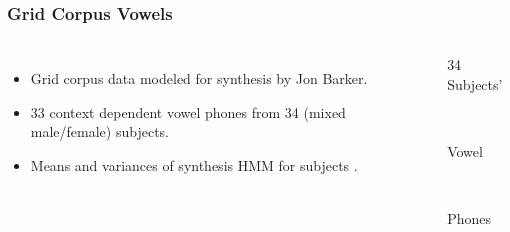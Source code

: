 \begin{frame}
  \frametitle{Grid Corpus Vowels}
  \begin{columns}
    \begin{itemize}
    \item Grid corpus data modeled for synthesis by Jon Barker.
    \item 33 context dependent vowel phones from 34 (mixed male/female) subjects.
    \item Means and variances of synthesis HMM for subjects {\scriptsize \citep{Shichiri:eigenvoices02}}.
    \end{itemize}

    \begin{center}
      \begin{minipage}[b][0.8\textheight][t]{0.5\columnwidth}%
        \begin{minipage}[c][0.3\textheight]{1\columnwidth}%
          \begin{center}
            34 Subjects'
          \end{center}%
        \end{minipage}\\
        \begin{minipage}[c][0.3\textheight]{1\columnwidth}%
          \begin{center}
            Vowel
          \end{center}%
        \end{minipage}\\
        \begin{minipage}[c][0.3\textheight]{1\columnwidth}%
          \begin{center}
            Phones 
          \end{center}
        \end{minipage}
      \end{minipage}
\end{center}
\end{columns}
\end{frame}
